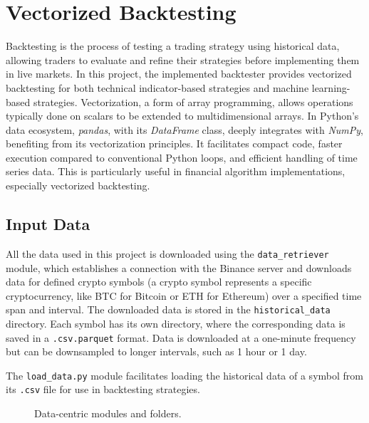 \chapter{Vectorized Backtesting}


Backtesting is the process of testing a trading strategy using historical data, allowing traders to evaluate and refine their strategies before implementing them in live markets.
In this project, the implemented backtester provides vectorized backtesting for both technical indicator-based strategies and machine learning-based strategies.
Vectorization, a form of array programming, allows operations typically done on scalars to be extended to multidimensional arrays.
In Python's data ecosystem, \textit{pandas}, with its \textit{DataFrame} class, deeply integrates with \textit{NumPy}, benefiting from its vectorization principles.
It facilitates compact code, faster execution compared to conventional Python loops, and efficient handling of time series data. This is particularly useful in financial algorithm implementations, especially vectorized backtesting.

\section{Input Data}


All the data used in this project is downloaded using the \texttt{data\_retriever} module, which establishes a connection with the Binance server and downloads data for defined crypto symbols (a crypto symbol represents a specific cryptocurrency, like BTC for Bitcoin or ETH for Ethereum) over a specified time span and interval. The downloaded data is stored in the \texttt{historical\_data} directory. Each symbol has its own directory, where the corresponding data is saved in a \texttt{.csv.parquet} format. Data is downloaded at a one-minute frequency but can be downsampled to longer intervals, such as 1 hour or 1 day.

The \texttt{load\_data.py} module facilitates loading the historical data of a symbol from its \texttt{.csv} file for use in backtesting strategies.

\begin{figure}[h]

\caption{Data-centric modules and folders.}\label{fig:inputdata}
\end{figure}

